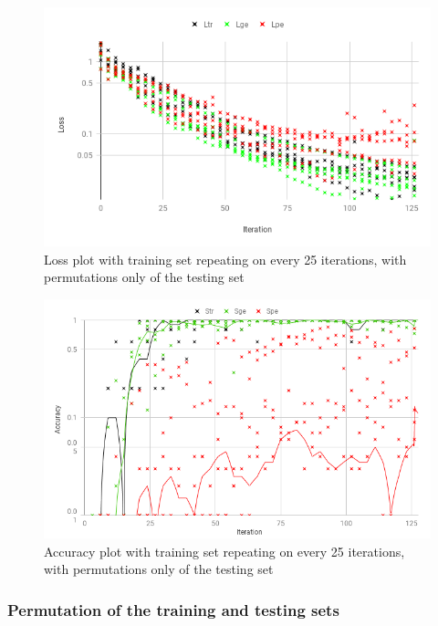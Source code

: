 \begin{enumerate}[label=(\Alph*)]
        \begin{figure}[H]
            \centering
            \includegraphics[width=.9\linewidth]{fig/content/results/shortest_path/epochs_base.png}
            \caption{Loss plot with training set repeating on every 25 iterations, with permutations only of the testing set}
            \label{fig:shotest_paths_base_epochs_results}
        \end{figure}
        
        \begin{figure}[H]
            \centering
            \includegraphics[width=.9\linewidth]{fig/content/results/shortest_path/epochs_base_ACC.png}
            \caption{Accuracy plot with training set repeating on every 25 iterations, with permutations only of the testing set}
            \label{fig:shotest_paths_base_epochs_ACC_results}
        \end{figure}

    \end{enumerate}

\subsubsection {Permutation of the training and testing sets}

